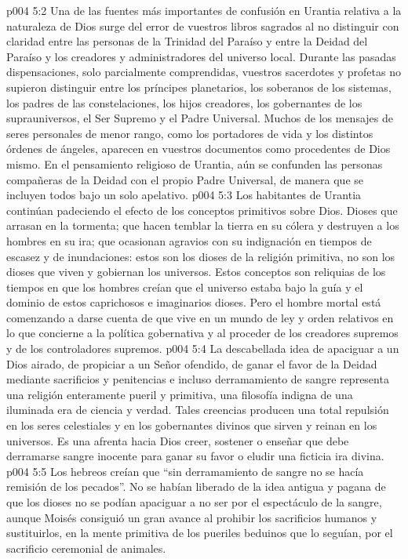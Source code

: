 \vs p004 5:2 Una de las fuentes más importantes de confusión en Urantia relativa a la naturaleza de Dios surge del error de vuestros libros sagrados al no distinguir con claridad entre las personas de la Trinidad del Paraíso y entre la Deidad del Paraíso y los creadores y administradores del universo local. Durante las pasadas dispensaciones, solo parcialmente comprendidas, vuestros sacerdotes y profetas no supieron distinguir entre los príncipes planetarios, los soberanos de los sistemas, los padres de las constelaciones, los hijos creadores, los gobernantes de los suprauniversos, el Ser Supremo y el Padre Universal. Muchos de los mensajes de seres personales de menor rango, como los portadores de vida y los distintos órdenes de ángeles, aparecen en vuestros documentos como procedentes de Dios mismo. En el pensamiento religioso de Urantia, aún se confunden las personas compañeras de la Deidad con el propio Padre Universal, de manera que se incluyen todos bajo un solo apelativo.
\vs p004 5:3 \pc Los habitantes de Urantia continúan padeciendo el efecto de los conceptos primitivos sobre Dios. Dioses que arrasan en la tormenta; que hacen temblar la tierra en su cólera y destruyen a los hombres en su ira; que ocasionan agravios con su indignación en tiempos de escasez y de inundaciones: estos son los dioses de la religión primitiva, no son los dioses que viven y gobiernan los universos. Estos conceptos son reliquias de los tiempos en que los hombres creían que el universo estaba bajo la guía y el dominio de estos caprichosos e imaginarios dioses. Pero el hombre mortal está comenzando a darse cuenta de que vive en un mundo de ley y orden relativos en lo que concierne a la política gobernativa y al proceder de los creadores supremos y de los controladores supremos.
\vs p004 5:4 \pc La descabellada idea de apaciguar a un Dios airado, de propiciar a un Señor ofendido, de ganar el favor de la Deidad mediante sacrificios y penitencias e incluso derramamiento de sangre representa una religión enteramente pueril y primitiva, una filosofía indigna de una iluminada era de ciencia y verdad. Tales creencias producen una total repulsión en los seres celestiales y en los gobernantes divinos que sirven y reinan en los universos. Es una afrenta hacia Dios creer, sostener o enseñar que debe derramarse sangre inocente para ganar su favor o eludir una ficticia ira divina.
\vs p004 5:5 Los hebreos creían que “sin derramamiento de sangre no se hacía remisión de los pecados”. No se habían liberado de la idea antigua y pagana de que los dioses no se podían apaciguar a no ser por el espectáculo de la sangre, aunque Moisés consiguió un gran avance al prohibir los sacrificios humanos y sustituirlos, en la mente primitiva de los pueriles beduinos que lo seguían, por el sacrificio ceremonial de animales.
